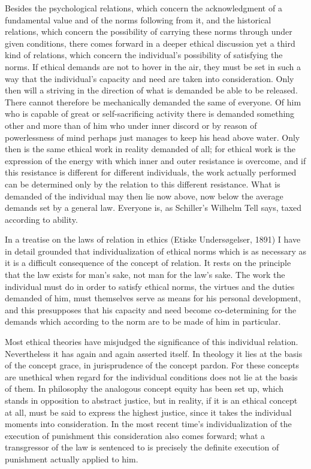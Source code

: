 \documentclass[12pt]{article}
\newcommand{\opage}[1]{\marginnote{\footnotesize\textit{[#1]}}}
\begin{document}
\noindent Besides the psychological relations, which concern the
acknowledgment of a fundamental value and of the norms following from it,
and the historical relations, which concern the possibility of carrying
these norms through under given conditions, there comes forward in a deeper
ethical discussion yet a third kind of relations, which concern the
individual's possibility of satisfying the norms. If ethical demands are not
to hover in the air, they must be set in such a way that the individual's
capacity and need are taken into consideration. Only then will a striving in
the direction of what is demanded be able to be released. There cannot
therefore be mechanically demanded the same of everyone. Of him who is
capable of great or self-sacrificing activity there is demanded something
other and more than of him who under inner discord or by reason of
powerlessness of mind perhaps just manages to keep his head above water.
Only then is the same ethical work in reality demanded of all; for ethical
work is the expression of the energy with which inner and outer resistance
is overcome, and if this resistance is different for different individuals,
the \opage{91}work actually performed can be determined only by the relation to this
different resistance. What is demanded of the individual may then lie now
above, now below the average demands set by a general law. Everyone is, as
Schiller's Wilhelm Tell says, taxed according to ability.

In a treatise on the laws of relation in ethics (Etiske Undersøgelser, 1891)
I have in detail grounded that individualization of ethical norms which is
as necessary as it is a difficult consequence of the concept of relation. It
rests on the principle that the law exists for man's sake, not man for the
law's sake. The work the individual must do in order to satisfy ethical
norms, the virtues and the duties demanded of him, must themselves serve as
means for his personal development, and this presupposes that his capacity
and need become co-determining for the demands which according to the norm
are to be made of him in particular.

Most ethical theories have misjudged the significance of this individual
relation. Nevertheless it has again and again asserted itself. In theology
it lies at the basis of the concept grace, in jurisprudence of the concept
pardon. For these concepts are unethical when regard for the individual
conditions does not lie at the basis of them. In philosophy the analogous
concept equity has been set up, which stands in opposition to abstract
justice, but in reality, if it is an ethical concept at all, must be said to
express the highest justice, since it takes the individual moments into
consideration. In the most recent time's individualization of the execution
of punishment this consideration also comes forward; what a transgressor of
the law is sentenced to is precisely the definite execution of punishment
actually applied to him.
\end{document}
